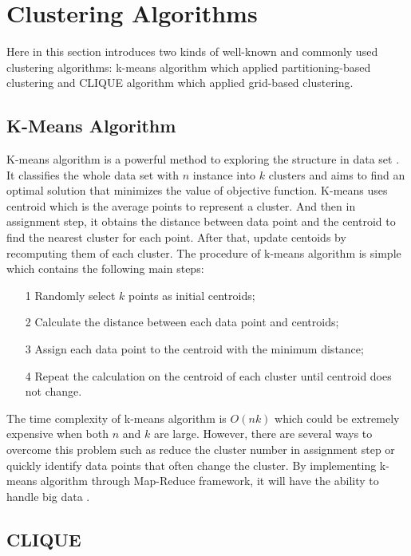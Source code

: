 \documentclass[sigconf]{acmart}
\begin{document}
\section{Clustering Algorithms}

Here in this section introduces two kinds of well-known and commonly used clustering algorithms: k-means algorithm which applied partitioning-based clustering and CLIQUE algorithm which applied grid-based clustering.

\subsection{K-Means Algorithm}

K-means algorithm is a powerful method to exploring the structure in data set \cite{bdca}. It classifies the whole data set with $n$ instance into $k$ clusters and aims to find an optimal solution that minimizes the value of objective function. K-means uses centroid which is the average points to represent a cluster. And then in assignment step, it obtains the distance between data point and the centroid to find the nearest cluster for each point. After that, update centoids by recomputing them of each cluster. The procedure of k-means algorithm is simple which contains the following main steps:
\begin{itemize}
\item[1] Randomly select $k$ points as initial centroids;
\item[2] Calculate the distance between each data point and centroids;
\item[3] Assign each data point to the centroid with the minimum distance;
\item[4] Repeat the calculation on the centroid of each cluster until centroid does not change.
\end{itemize}

The time complexity of k-means algorithm is $O(nk)$ which could be extremely expensive when both $n$ and $k$ are large. However, there are several ways to overcome this problem such as reduce the cluster number in assignment step or quickly identify data points that often change the cluster. By implementing k-means algorithm through Map-Reduce framework, it will have the ability to handle big data \cite{bdca}.

\subsection{CLIQUE}
\end{document}
